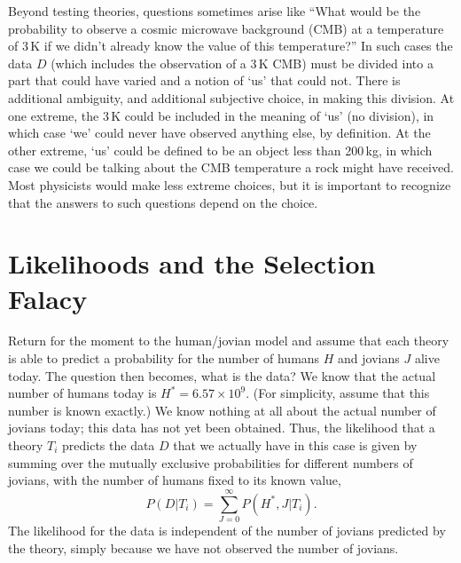 \documentclass[pra,floatfix,preprint,nofootinbib,12pt]{revtex4}
\begin{document}
Beyond testing theories, questions sometimes arise like ``What would be the probability to observe a cosmic microwave background (CMB) at a temperature of 3$\,$K if we didn't already know the value of this temperature?''  In such cases the data $D$ (which includes the observation of a 3$\,$K CMB) must be divided into a part that could have varied and a notion of `us' that could not. There is additional ambiguity, and additional subjective choice, in making this division. At one extreme, the 3$\,$K could be included in the meaning of `us' (no division), in which case `we' could never have observed anything else, by definition. At the other extreme, `us' could be defined to be an object less than 200$\,$kg, in which case we could be talking about the CMB temperature a rock might have received.  Most physicists would make less extreme choices, but it is important to recognize that the answers to such questions depend on the choice. 

\section{Likelihoods and the Selection Falacy}

Return for the moment  to the human/jovian model and assume that each theory is able to predict a probability for the
number of humans $H$ and jovians $J$ alive today.  
The question then becomes, what is the data?  
We know that the actual number of humans today is ${H^*}=6.57\times 10^9$.  
(For simplicity, assume that this number is known exactly.)   
We know nothing at all about the actual number of jovians today; this data has not yet been 
obtained.  Thus, the likelihood that a theory $T_i$ predicts the data $D$ that we actually have 
in this case is given by summing over the mutually exclusive probabilities for different numbers
of jovians, with the number of humans fixed to its known value,
\begin{equation}
P(D|T_i) = \sum_{J=0}^\infty P({H^*},J|T_i)  .
\label{PDT}
\end{equation} 
The likelihood for the data is independent of the number of jovians predicted by
the theory, simply because we have not observed the number of jovians.
\end{document}
